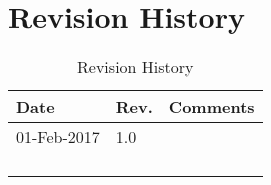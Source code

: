 \chapter{Revision History}\label{revision-history}

\begin{longtable}[]{@{}lll@{}}
	\toprule
	Date & Rev. & Comments\tabularnewline
	\midrule
	\endhead
	01-Feb-2017 & 1.0 &\tabularnewline
	            &     &\tabularnewline
	            &     &\tabularnewline
	            &     &\tabularnewline
	\bottomrule
	\caption{Revision History}
\end{longtable}
 